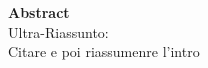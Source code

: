 
\begin{center}
\textbf{Abstract}\\
Ultra-Riassunto:\\
Citare \cite{kpabe} e poi riassumenre l'intro
\end{center}
